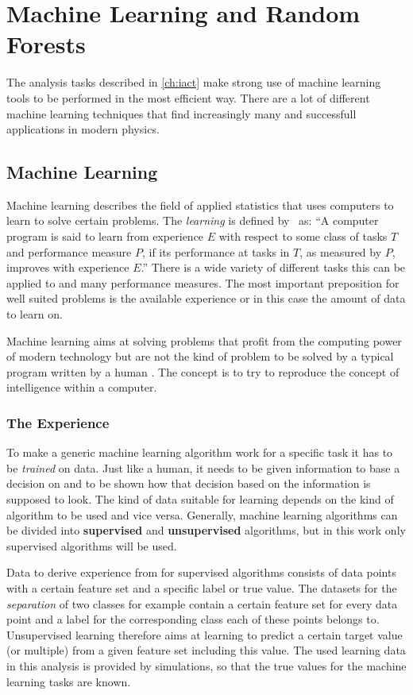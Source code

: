 \chapter{Machine Learning and Random Forests}
\label{ch:ML}
%
The analysis tasks described in \autoref{ch:iact} make strong use of machine
learning tools to be performed in the most efficient way. There are a lot of
different machine learning techniques that find increasingly many and
successfull applications in modern physics.

\section{Machine Learning}
%
Machine learning describes the field of applied statistics that uses computers to learn to solve certain problems. The \textit{learning} is defined by~\cite{mitchell} as: \enquote{A computer program is said to learn from experience $E$ with respect to some class of tasks $T$ and performance measure $P$, if its performance at tasks in $T$, as measured by $P$, improves with experience $E$.} There is a wide variety of different tasks this can be applied to and many performance measures. The most important preposition for well suited problems is the available experience or in this case the amount of data to learn on.

Machine learning aims at solving problems that profit from the computing power
of modern technology but are not the kind of problem to be solved by a typical
program written by a human \cite{goodfellow}. The concept is to try to
reproduce the concept of intelligence within a computer.

\subsection{The Experience}
%
To make a generic machine learning algorithm work for a specific task it has to
be \textit{trained} on data. Just like a human, it needs to be given
information to base a decision on and to be shown how that decision based on
the information is supposed to look. The kind of data suitable for learning
depends on the kind of algorithm to be used and vice versa. Generally, machine
learning algorithms can be divided into \textbf{supervised} and
\textbf{unsupervised} algorithms, but in this work only supervised algorithms
will be used.

Data to derive experience from for supervised algorithms consists of data points
with a certain feature set and a specific label or true value. The datasets for
the \textit{separation} of two classes for example contain a certain feature
set for every data point and a label for the corresponding class each of these
points belongs to. Unsupervised learning therefore aims at learning to predict
a certain target value (or multiple) from a given feature set including this
value. The used learning data in this analysis is provided by simulations, so
that the true values for the machine learning tasks are known.

